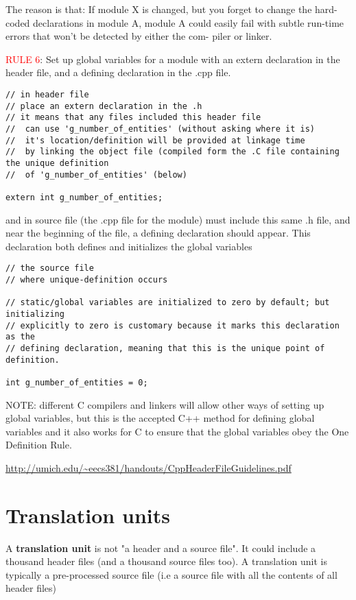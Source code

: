 The reason is that: If module X is changed, but you forget to change the
hard-coded declarations in module A, module A could easily fail with subtle
run-time errors that won’t be detected by either the com- piler or linker.
  

\textcolor{red}{RULE 6}:
Set up global variables for a module with an extern declaration in the header
file, and a defining declaration in the .cpp file.
\begin{verbatim}
// in header file
// place an extern declaration in the .h 
// it means that any files included this header file
//  can use 'g_number_of_entities' (without asking where it is)
//  it's location/definition will be provided at linkage time
//  by linking the object file (compiled form the .C file containing the unique definition
//  of 'g_number_of_entities' (below)

extern int g_number_of_entities;
\end{verbatim}
and in source file
(the .cpp file for the module) must include this same .h file, 
and near the beginning of the file, a defining declaration should appear.
This declaration both defines and initializes the global variables

\begin{verbatim}
// the source file
// where unique-definition occurs

// static/global variables are initialized to zero by default; but initializing
// explicitly to zero is customary because it marks this declaration as the
// defining declaration, meaning that this is the unique point of definition.

int g_number_of_entities = 0;
\end{verbatim}

NOTE: different C compilers and linkers will allow other ways of setting up
global variables, but this is the accepted C++ method for defining global
variables and it also works for C to ensure that the global variables obey the
One Definition Rule.
 
\url{http://umich.edu/~eecs381/handouts/CppHeaderFileGuidelines.pdf}



\section{Translation units}

\label{sec:translation-unit}


A {\bf translation unit} is not "a header and a source file". It could include a
thousand header files (and a thousand source files too).
A translation unit is typically a pre-processed source file (i.e a source file
with all the contents of all header files)

